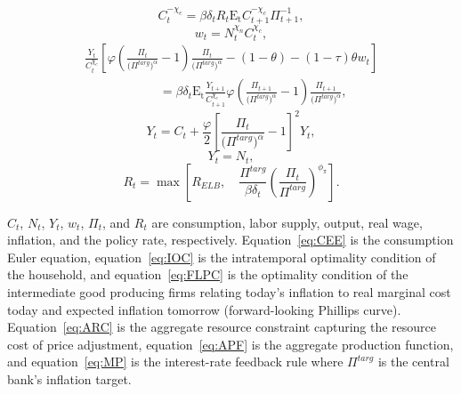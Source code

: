 \documentclass[11pt]{article}
\begin{document}
	\begin{equation}
		C_{t}^{-\chi_{c}} = \beta\delta_{t}R_{t}\mathrm{E_{t}}C_{t+1}^{-\chi_{c}}\Pi_{t+1}^{-1},\label{eq:CEE}
	\end{equation}
	\begin{equation}
		w_{t}=N_{t}^{\chi_{n}}C_{t}^{\chi_{c}},\label{eq:IOC}
	\end{equation}
	\begin{equation}
		\begin{multlined}
			\frac{Y_{t}}{C_{t}^{\chi_{c}}}\left[\varphi \left(\frac{\Pi_{t}}{\bigl(\Pi^{targ}\bigr)^{\alpha}}-1\right)\frac{\Pi_{t}}{\bigl(\Pi^{targ}\bigr)^{\alpha}} - (1-\theta)- (1-\tau)\theta w_{t}\right]\\
			\hspace{6em}= \beta\delta_{t}\mathrm{E_{t}}\frac{Y_{t+1}}{C_{t+1}^{\chi_{c}}}\varphi \left(\frac{\Pi_{t+1}}{\bigl(\Pi^{targ}\bigr)^{\alpha}}-1\right)\frac{\Pi_{t+1}}{\bigl(\Pi^{targ}\bigr)^{\alpha}},\label{eq:FLPC}
		\end{multlined}
	\end{equation}
	\begin{equation}
		Y_{t} = C_{t} + \frac{\varphi}{2}\left[\frac{\Pi_{t}}{\bigl(\Pi^{targ}\bigr)^{\alpha}}-1\right]^{2}Y_{t},\label{eq:ARC}
	\end{equation}
	\begin{equation}
		Y_{t}=N_{t}, \label{eq:APF}
	\end{equation}
	\begin{equation}
		R_{t} = \max \left[R_{ELB}, \quad\frac{\Pi^{targ}}{\beta\delta_t}\left(\frac{\Pi_{t}}{\Pi^{targ}}\right)^{\phi_{\pi}}\right].\label{eq:MP}
	\end{equation}

	\noindent $C_{t}$, $N_{t}$, $Y_{t}$, $w_{t}$, $\Pi_{t}$, and $R_{t}$ are consumption, labor supply, output, real  wage, inflation, and the policy rate, respectively. Equation~\ref{eq:CEE} is the consumption Euler equation, equation~\ref{eq:IOC} is the intratemporal optimality condition of the household, and equation~\ref{eq:FLPC} is the optimality condition of the intermediate good producing firms relating today's inflation to real marginal cost today and expected inflation tomorrow (forward-looking Phillips curve). Equation~\ref{eq:ARC} is the aggregate resource constraint capturing the resource cost of price adjustment,  equation~\ref{eq:APF} is the aggregate production function, and equation~\ref{eq:MP} is the interest-rate feedback rule where $\Pi^{targ}$ is the central bank's inflation target.
\end{document}
